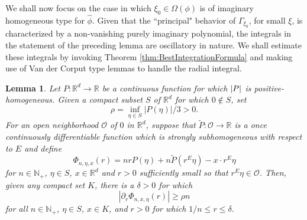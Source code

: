 \documentclass[11pt]{article}
\newtheorem{lemma}[theorem]{Lemma}
\begin{document}
We shall now focus on the case in which $\xi_0\in\Omega(\phi)$ is of imaginary homogeneous type for $\widehat{\phi}$. Given that the ``principal" behavior of $\Gamma_{\xi_0}$, for small $\xi$, is characterized by a non-vanishing purely imaginary polynomial, the integrals in the statement of the preceding lemma are oscillatory in nature. We shall estimate these integrals by invoking Theorem \ref{thm:BestIntegrationFormula} and making use of Van der Corput type lemmas to handle the radial integral.  \\






\begin{lemma}\label{lem:supersubhom}
Let $P:\mathbb{R}^d\to\mathbb{R}$ be a continuous function for which $\abs{P}$ is positive-homogeneous. Given a compact subset $S$ of $\mathbb{R}^d$ for which $0\notin S$, set
\begin{equation*}
    \rho=\inf_{\eta\in S}|P(\eta)|/3>0.
\end{equation*}
For an open neighborhood $\mathcal{O}$ of $0$ in $\mathbb{R}^d$, suppose that $\widetilde{P}:\mathcal{O}\to\mathbb{R}$ is a once continuously differentiable function which is strongly subhomogeneous with respect to $E$ and define
\begin{equation*}
\Phi_{n,\eta,x}(r)=nrP(\eta)+n\widetilde{P}(r^E\eta)-x\cdot r^E\eta
\end{equation*}
for $n\in\mathbb{N}_+$, $\eta\in S$, $x\in\mathbb{R}^d$ and $r>0$ sufficiently small so that $r^E\eta\in\mathcal{O}$. Then, given any compact set $K$, there is a $\delta>0$ for which
\begin{equation*}
    |\partial_r \Phi_{n,x,\eta}(r)|\geq \rho n
\end{equation*}
for all $n\in\mathbb{N}_+$, $\eta\in S$,  $x\in K$, and $r>0$ for which $1/n\leq r\leq \delta$.
\end{lemma}
\end{document}
